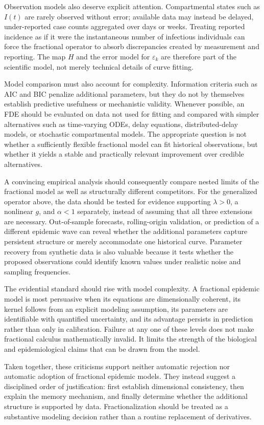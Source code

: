 \documentclass[00-main.tex]{subfiles}
\begin{document}
Observation models also deserve explicit attention.
Compartmental states such as $I(t)$ are rarely observed without error; available data may instead be delayed, under-reported case counts aggregated over days or weeks.
Treating reported incidence as if it were the instantaneous number of infectious individuals can force the fractional operator to absorb discrepancies created by measurement and reporting.
The map $H$ and the error model for $\varepsilon_k$ are therefore part of the scientific model, not merely technical details of curve fitting.

Model comparison must also account for complexity.
Information criteria such as AIC and BIC penalize additional parameters, but they do not by themselves establish predictive usefulness or mechanistic validity.
Whenever possible, an FDE should be evaluated on data not used for fitting and compared with simpler alternatives such as time-varying ODEs, delay equations, distributed-delay models, or stochastic compartmental models.
The appropriate question is not whether a sufficiently flexible fractional model can fit historical observations, but whether it yields a stable and practically relevant improvement over credible alternatives.

A convincing empirical analysis should consequently compare nested limits of the fractional model as well as structurally different competitors.
For the generalized operator above, the data should be tested for evidence supporting $\lambda>0$, a nonlinear $g$, and $\alpha<1$ separately, instead of assuming that all three extensions are necessary.
Out-of-sample forecasts, rolling-origin validation, or prediction of a different epidemic wave can reveal whether the additional parameters capture persistent structure or merely accommodate one historical curve.
Parameter recovery from synthetic data is also valuable because it tests whether the proposed observations could identify known values under realistic noise and sampling frequencies.

The evidential standard should rise with model complexity.
A fractional epidemic model is most persuasive when its equations are dimensionally coherent, its kernel follows from an explicit modeling assumption, its parameters are identifiable with quantified uncertainty, and its advantage persists in prediction rather than only in calibration.
Failure at any one of these levels does not make fractional calculus mathematically invalid.
It limits the strength of the biological and epidemiological claims that can be drawn from the model.

Taken together, these criticisms support neither automatic rejection nor automatic adoption of fractional epidemic models.
They instead suggest a disciplined order of justification: first establish dimensional consistency, then explain the memory mechanism, and finally determine whether the additional structure is supported by data.
Fractionalization should be treated as a substantive modeling decision rather than a routine replacement of derivatives.

\ifSubfilesClassLoaded{\printbibliography}{}
\end{document}
